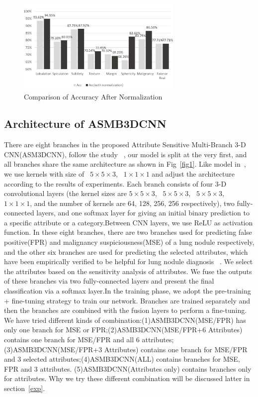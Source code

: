 \documentclass[runningheads]{llncs}
\begin{document}
\begin{figure}[htb]
\centerline{\includegraphics[width=80mm]{fig2.pdf}}
\vspace{-0.5cm}
\caption{Comparison of Accuracy After Normalization}
\vspace{-0.5cm}
\label{normalization}
\end{figure}






\subsection{Architecture of ASMB3DCNN}
\label{architecture}
There are eight branches in the proposed Attribute Sensitive Multi-Branch 3-D CNN(ASM3DCNN), follow the study ~\cite{nanwu2019dnn}, our model is split at the very first, and all branches share the same architecture as shown in Fig~\ref{fig1}.
Like model in~\cite{Qi2016Multilevel}, we use kernels with size of  ~$5\times5\times3$, ~$1\times1\times1$ and adjust the architecture according to the results of experiments. Each branch consists of four 3-D convolutional layers (the kernel sizes are $5\times5\times3$, ~$5\times5\times3$, ~$5\times5\times3$, ~$1\times1\times1$, and the number of kernels are 64, 128, 256, 256 respectively), two fully-connected layers, and one softmax layer for giving an initial binary prediction to a specific attribute or a category.Between CNN layers, we use ReLU as activation function. In these eight branches, there are two branches used for predicting false positive(FPR) and malignancy suspiciousness(MSE) of a lung nodule respectively, and the other six branches are used for predicting the selected attributes, which have been empirically verified to be helpful for lung nodule diagnosis~ \cite{Hussein2017Risk}. 
We select the attributes based on the sensitivity analysis of attributes.  We fuse the outputs of these branches via two fully-connected layers and present the final classification via a softmax layer.In the training phase, we adopt the pre-training + fine-tuning strategy to train our network. Branches are trained separately and then the branches are combined with the fusion layers to perform a fine-tuning. We have tried different kinds of combination:(1)ASMB3DCNN(MSE/FPR)  has only one branch for MSE or FPR;(2)ASMB3DCNN(MSE/FPR+6 Attributes) contains one branch for MSE/FPR and all 6 attributes;(3)ASMB3DCNN(MSE/FPR+3 Attributes)  contains one branch for MSE/FPR and 3 selected attributes;(4)ASMB3DCNN(ALL) contains branches for MSE, FPR and 3  attributes. (5)ASMB3DCNN(Attributes only) contains branches only for attributes. Why we try these different combination will be discussed latter in section~\ref{exp}.
\end{document}

